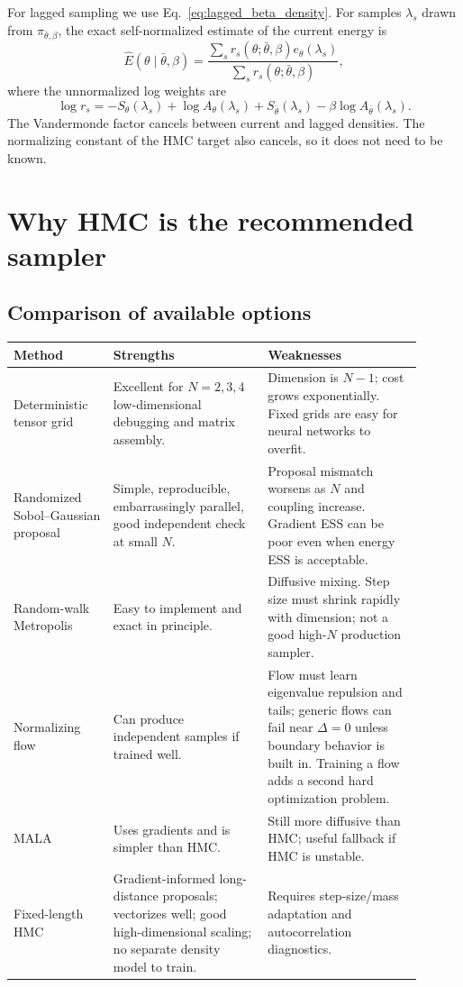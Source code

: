\documentclass[11pt]{article}
\newcommand{\D}{\Delta}
\begin{document}
For lagged sampling we use Eq.~\eqref{eq:lagged_beta_density}.  For samples $\lambda_s$ drawn from $\pi_{\bar\theta,\beta}$, the exact self-normalized estimate of the current energy is
\begin{equation}
 \widehat E(\theta\mid\bar\theta,\beta)=
 \frac{\sum_s r_s(\theta;\bar\theta,\beta)e_\theta(\lambda_s)}{\sum_s r_s(\theta;\bar\theta,\beta)},
 \label{eq:lagged_energy}
\end{equation}
where the unnormalized log weights are
\begin{equation}
 \log r_s=
 -S_\theta(\lambda_s)+\log A_\theta(\lambda_s)
 +S_{\bar\theta}(\lambda_s)-\beta\log A_{\bar\theta}(\lambda_s).
 \label{eq:lagged_weights}
\end{equation}
The Vandermonde factor cancels between current and lagged densities.  The normalizing constant of the HMC target also cancels, so it does not need to be known.

\section{Why HMC is the recommended sampler}

\subsection{Comparison of available options}

\begin{longtable}{p{0.22\linewidth}p{0.34\linewidth}p{0.34\linewidth}}
\toprule
Method & Strengths & Weaknesses \\
\midrule
Deterministic tensor grid & Excellent for $N=2,3,4$ low-dimensional debugging and matrix assembly. & Dimension is $N-1$; cost grows exponentially.  Fixed grids are easy for neural networks to overfit. \\
Randomized Sobol--Gaussian proposal & Simple, reproducible, embarrassingly parallel, good independent check at small $N$. & Proposal mismatch worsens as $N$ and coupling increase.  Gradient ESS can be poor even when energy ESS is acceptable. \\
Random-walk Metropolis & Easy to implement and exact in principle. & Diffusive mixing.  Step size must shrink rapidly with dimension; not a good high-$N$ production sampler. \\
Normalizing flow & Can produce independent samples if trained well. & Flow must learn eigenvalue repulsion and tails; generic flows can fail near $\D=0$ unless boundary behavior is built in.  Training a flow adds a second hard optimization problem. \\
MALA & Uses gradients and is simpler than HMC. & Still more diffusive than HMC; useful fallback if HMC is unstable. \\
Fixed-length HMC & Gradient-informed long-distance proposals; vectorizes well; good high-dimensional scaling; no separate density model to train. & Requires step-size/mass adaptation and autocorrelation diagnostics. \\
\bottomrule
\end{longtable}
\end{document}
